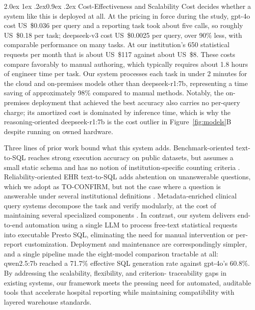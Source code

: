 \documentclass[10pt,twocolumn]{article}
\makeatletter
\renewcommand\subsection{\@startsection{subsection}{2}{\z@}%
  {2.0ex \@plus 1ex \@minus .2ex}{0.9ex \@plus .2ex}%
  {\normalfont\normalsize\bfseries}}
\makeatother
\begin{document}
\subsection{Cost-Effectiveness and Scalability}
Cost decides whether a system like this is deployed at all. At the pricing in force during the study, gpt-4o cost US~\$0.036 per query and a reporting task took about five calls, so roughly US~\$0.18 per task; deepseek-v3 cost US~\$0.0025 per query, over 90\% less, with comparable performance on many tasks. At our institution's 650 statistical requests per month that is about US~\$117 against about US~\$8. These costs compare favorably to manual authoring, which typically
requires about 1.8 hours of engineer time per task. Our system processes
each task in under 2 minutes for the cloud and on-premises models other than
deepseek-r1:7b, representing a time saving of approximately 98\% compared to
manual methods. Notably, the on-premises deployment that achieved the best
accuracy also carries no per-query charge; its amortized cost is dominated by
inference time, which is why the reasoning-oriented deepseek-r1:7b is the cost
outlier in Figure~\ref{fig:models}B despite running on owned hardware.

Three lines of prior work bound what this system adds. Benchmark-oriented text-to-SQL reaches strong execution accuracy on public datasets, but assumes a small static schema and has no notion of institution-specific counting criteria \cite{yu2018,guo2019,bogin2019,tsqlsurvey2024}. Reliability-oriented EHR text-to-SQL adds abstention on unanswerable questions, which we adopt as TO-CONFIRM, but not the case where a question is answerable under several institutional definitions \cite{ehrsql2024}. Metadata-enriched clinical query systems decompose the task and verify modularly, at the cost of maintaining several specialized components \cite{metaclin2025,sqlthought2025}. In contrast, our system delivers end-to-end
automation using a single LLM to process free-text statistical requests into
executable Presto SQL, eliminating the need for manual intervention or
per-report customization. Deployment and maintenance are correspondingly simpler, and a single pipeline made the eight-model comparison tractable at all: qwen2.5:7b reached a 71.7\% effective SQL generation rate against gpt-4o's 60.8\%. By addressing the scalability, flexibility, and criterion-
traceability gaps in existing systems, our framework meets the pressing need for
automated, auditable tools that accelerate hospital reporting while maintaining
compatibility with layered warehouse standards.
\end{document}
